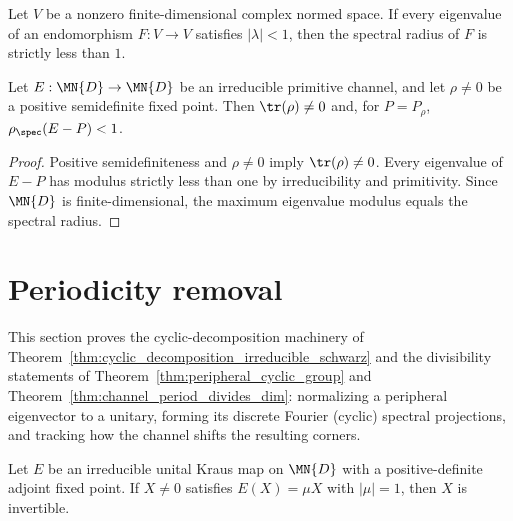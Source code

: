\begin{theorem}
    \label{thm:spectralRadius_lt_one_of_eigenvalues_lt_one}
    \leanok
    Let $V$ be a nonzero finite-dimensional complex normed space. If every
    eigenvalue of an endomorphism $F:V\to V$ satisfies $|\lambda|<1$, then the
    spectral radius of $F$ is strictly less than $1$.
\end{theorem}

\begin{theorem}%
    \label{thm:primitive_fixedPoint_compl_lt_one_irred_channel}
    \leanok
    Let $E:\MN{D}\to\MN{D}$ be an irreducible primitive channel, and let
    $\rho\ne0$ be a positive semidefinite fixed point. Then
    $\tr(\rho)\ne0$ and, for $P=P_\rho$,
    $\rho_{\spec}(E-P)<1$.
\end{theorem}

\begin{proof}\leanok
    Positive semidefiniteness and $\rho\ne0$ imply $\tr(\rho)\ne0$.
    Every eigenvalue of $E-P$ has modulus strictly less than one by
    irreducibility and primitivity. Since $\MN{D}$ is finite-dimensional,
    the maximum eigenvalue modulus equals the spectral radius.
\end{proof}

\section{Periodicity removal}
\label{sec:app_spectral_periodicity}

This section proves the cyclic-decomposition machinery of
Theorem~\ref{thm:cyclic_decomposition_irreducible_schwarz} and the
divisibility statements of Theorem~\ref{thm:peripheral_cyclic_group} and
Theorem~\ref{thm:channel_period_divides_dim}: normalizing a peripheral
eigenvector to a unitary, forming its discrete Fourier (cyclic) spectral
projections, and tracking how the channel shifts the resulting corners.

\begin{lemma}%
    \label{lem:isUnit_peripheral_eigenvector}
    \leanok
    Let $E$ be an irreducible unital Kraus map on $\MN{D}$ with a
    positive-definite adjoint fixed point.
    If $X \ne 0$ satisfies $E(X) = \mu X$ with $|\mu| = 1$,
    then $X$ is invertible.
\end{lemma}

